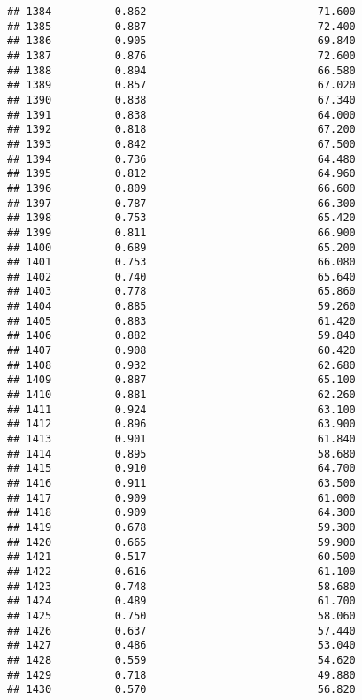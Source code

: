 \documentclass[
]{article}
\begin{document}
\begin{verbatim}
## 1384          0.862                           71.600
## 1385          0.887                           72.400
## 1386          0.905                           69.840
## 1387          0.876                           72.600
## 1388          0.894                           66.580
## 1389          0.857                           67.020
## 1390          0.838                           67.340
## 1391          0.838                           64.000
## 1392          0.818                           67.200
## 1393          0.842                           67.500
## 1394          0.736                           64.480
## 1395          0.812                           64.960
## 1396          0.809                           66.600
## 1397          0.787                           66.300
## 1398          0.753                           65.420
## 1399          0.811                           66.900
## 1400          0.689                           65.200
## 1401          0.753                           66.080
## 1402          0.740                           65.640
## 1403          0.778                           65.860
## 1404          0.885                           59.260
## 1405          0.883                           61.420
## 1406          0.882                           59.840
## 1407          0.908                           60.420
## 1408          0.932                           62.680
## 1409          0.887                           65.100
## 1410          0.881                           62.260
## 1411          0.924                           63.100
## 1412          0.896                           63.900
## 1413          0.901                           61.840
## 1414          0.895                           58.680
## 1415          0.910                           64.700
## 1416          0.911                           63.500
## 1417          0.909                           61.000
## 1418          0.909                           64.300
## 1419          0.678                           59.300
## 1420          0.665                           59.900
## 1421          0.517                           60.500
## 1422          0.616                           61.100
## 1423          0.748                           58.680
## 1424          0.489                           61.700
## 1425          0.750                           58.060
## 1426          0.637                           57.440
## 1427          0.486                           53.040
## 1428          0.559                           54.620
## 1429          0.718                           49.880
## 1430          0.570                           56.820

\end{verbatim}
\end{document}
